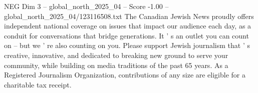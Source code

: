 \begin{textsample}{NEG Dim 3 – global\_north\_2025\_04 – Score -1.00 – global\_north\_2025\_04/123116508.txt}
The Canadian Jewish News proudly offers independent national coverage on issues that impact our audience each day, as a conduit for conversations that bridge generations.
It ' s an outlet you can count on -- but we ' re also counting on you.
Please support Jewish journalism that ' s creative, innovative, and dedicated to breaking new ground to serve your community, while building on media traditions of the past 65 years.
As a Registered Journalism Organization, contributions of any size are eligible for a charitable tax receipt.

\end{textsample}
